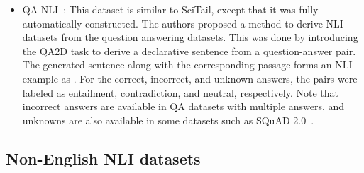 \documentclass[preprint,12pt]{elsarticle}
\begin{document}
\begin{itemize}
    \item QA-NLI~\citep{demszky2018transforming}: This dataset is similar to SciTail, except that it was fully automatically constructed. The authors proposed a method to derive NLI datasets from the question answering datasets. This was done by introducing the QA2D task to derive a declarative sentence from a question-answer pair. The generated sentence  along with the corresponding passage  forms an NLI example as . For the correct, incorrect, and unknown answers, the pairs were labeled as entailment, contradiction, and neutral, respectively. Note that incorrect answers are available in QA datasets with multiple answers, and unknowns are also available in some datasets such as SQuAD 2.0~\citep{rajpurkar2018know}. 
\end{itemize}

\subsection{Non-English NLI datasets}
\end{document}
